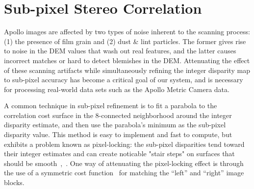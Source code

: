 \section{Sub-pixel Stereo Correlation}\label{sec:subpixel}

Apollo images are affected by two types of noise inherent to the
scanning process: (1) the presence of film grain and (2) dust \& lint
particles.  The former gives rise to noise in the DEM values that wash
out real features, and the latter causes incorrect matches or hard to
detect blemishes in the DEM.  Attenuating the effect of these scanning
artifacts while simultaneously refining the integer disparity map to
sub-pixel accuracy has become a critical goal of our system, and is
necessary for processing real-world data sets such as the Apollo
Metric Camera data.

A common technique in sub-pixel refinement is to fit a parabola to the
correlation cost surface in the 8-connected neighborhood around the
integer disparity estimate, and then use the parabola's minimum as the
sub-pixel disparity value. This method is easy to implement and fast
to compute, but exhibits a problem known as pixel-locking: the
sub-pixel disparities tend toward their integer estimates and can
create noticable "stair steps" on surfaces that should be
smooth~\cite{Stein06:attenuating},~\cite{Szeliski03sampling}.  One way
of attenuating the pixel-locking effect is through the use of a
symmetric cost function~\cite{Nehab05:improved} for matching the
``left'' and ``right'' image blocks.  

